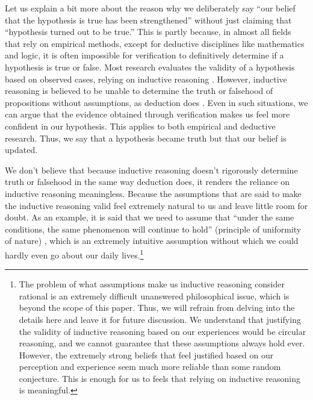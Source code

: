 
Let us explain a bit more about the reason why we deliberately say ``our belief that the hypothesis is true has been strengthened'' without just claiming that ``hypothesis turned out to be true.'' This is partly because, in almost all fields that rely on empirical methods, except for deductive disciplines like mathematics and logic, it is often impossible for verification to definitively determine if a hypothesis is true or false. Most research evaluates the validity of a hypothesis based on observed cases, relying on inductive reasoning \cite{sep-scientific-method}. However, inductive reasoning is believed to be unable to determine the truth or falsehood of propositions without assumptions, as deduction does \cite{sep-induction-problem}. Even in such situations, we can argue that the evidence obtained through verification makes us feel more confident in our hypothesis. This applies to both empirical and deductive research. Thus, we say that a hypothesis became truth but that our belief is updated.

We don't believe that because inductive reasoning doesn't rigorously determine truth or falsehood in the same way deduction does, it renders the reliance on inductive reasoning meaningless. Because the assumptions that are said to make the inductive reasoning valid feel extremely natural to us and leave little room for doubt. As an example, it is said that we need to assume that ``under the same conditions, the same phenomenon will continue to hold'' (principle of uniformity of nature) \cite{sep-induction-problem}, which is an extremely intuitive assumption without which we could hardly even go about our daily lives.\footnote{The problem of what assumptions make us inductive reasoning consider rational is an extremely difficult unanswered philosophical issue, which is beyond the scope of this paper. Thus, we will refrain from delving into the details here and leave it for future discussion. We understand that justifying the validity of inductive reasoning based on our experiences would be circular reasoning, and we cannot guarantee that these assumptions always hold ever. However, the extremely strong beliefs that feel justified based on our perception and experience seem much more reliable than some random conjecture. This is enough for us to feels that relying on inductive reasoning is meaningful.} 

